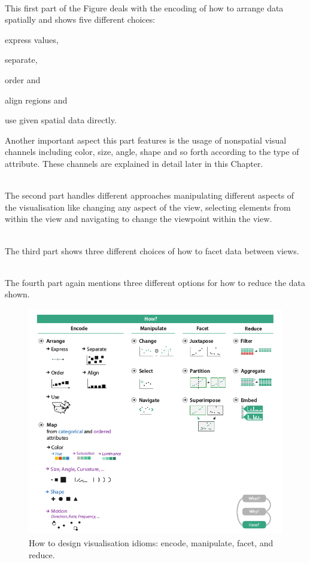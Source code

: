 \begin{enumerate}

 \hfill \\
This first part of the Figure deals with the encoding of how to arrange data spatially and shows five different choices:
    \begin{enumerate*}[label={(\arabic*)}]
    \item express values,
    \item separate,
    \item order and
    \item align regions and
    \item use given spatial data directly.
    \end{enumerate*}
Another important aspect this part features is the usage of nonspatial visual channels including color, size, angle, shape and so forth according to the type of attribute. These channels are explained in detail later in this Chapter.

 \hfill \\
The second part handles different approaches manipulating different aspects of the visualisation like changing any aspect of the view, selecting elements from within the view and navigating to change the viewpoint within the view.

 \hfill \\
The third part shows three different choices of how to facet data between views.

 \hfill \\
The fourth part again mentions three different options for how to reduce the data shown.

\end{enumerate}

\begin{figure}[!hbt]
\centering
\includegraphics[height=10cm,keepaspectratio]{images/basics/how.png}
\caption[
    How to design visualisation idioms: encode, manipulate, facet, and reduce .
]{How to design visualisation idioms: encode, manipulate, facet, and reduce.}
\label{fig:how}
\end{figure}

